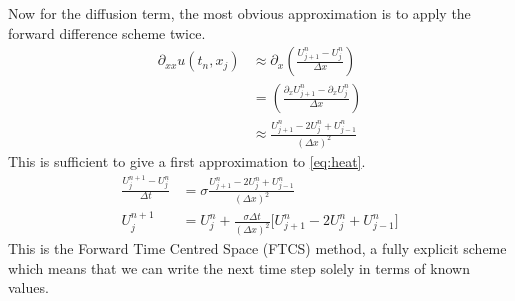 \documentclass[11pt, a4paper, draft]{article}
\newcommand{\Dt}{\Delta t}
\newcommand{\Dx}{\Delta x}
\begin{document}
        Now for the diffusion term, the most obvious approximation is to apply the forward difference scheme twice.
        \begin{align*}
        \partial_{xx} u(t_n,x_j) &\approx \partial_x \left(\frac{U^n_{j+1}- U^n_j}{\Dx}\right)\\
        &=  \left(\frac{\partial_xU^n_{j+1} - \partial_xU^n_j}{\Dx}\right)\\
        &\approx \frac{U^n_{j+1} - 2U^n_{j} + U^n_{j-1}}{(\Dx)^2}
        \end{align*}
        This is sufficient to give a first approximation to \eqref{eq:heat}.
        \begin{align}\label{eq:FTCS_heat}
        \frac{U^{n+1}_j- U^n_j}{\Dt} &= \sigma \frac{U^n_{j+1} - 2U^n_{j} + U^n_{j-1}}{(\Dx)^2}\\
        U^{n+1}_j &= U^n_j +  \frac{\sigma\Dt}{(\Dx)^2}\lbrack U^n_{j+1} - 2U^n_{j} + U^n_{j-1}\rbrack 
        \end{align}
        This is the Forward Time Centred Space (FTCS) method, a fully explicit scheme which means that we can write the next time step solely in terms of known values.
\end{document}
